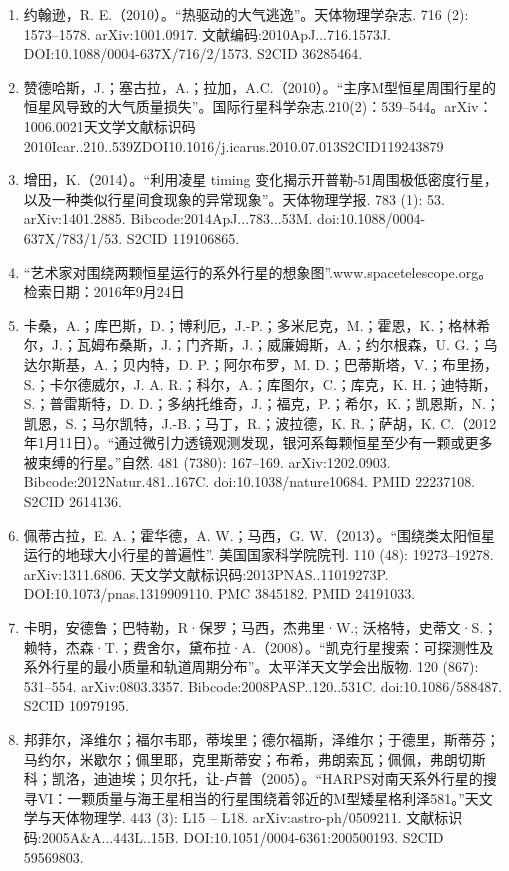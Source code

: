 \begin{enumerate}
\item 约翰逊，R. E.（2010）。“热驱动的大气逃逸”。天体物理学杂志. 716 (2): 1573–1578. arXiv:1001.0917. 文献编码:2010ApJ...716.1573J. DOI:10.1088/0004-637X/716/2/1573. S2CID 36285464.
\item 赞德哈斯，J.；塞古拉，A.；拉加，A.C.（2010）。“主序M型恒星周围行星的恒星风导致的大气质量损失”。国际行星科学杂志.210(2)：539–544。arXiv：1006.0021天文学文献标识码2010Icar..210..539ZDOI10.1016/j.icarus.2010.07.013S2CID119243879
\item 增田，K.（2014）。“利用凌星 timing 变化揭示开普勒-51周围极低密度行星，以及一种类似行星间食现象的异常现象”。天体物理学报. 783 (1): 53. arXiv:1401.2885. Bibcode:2014ApJ...783...53M. doi:10.1088/0004-637X/783/1/53. S2CID 119106865.
\item “艺术家对围绕两颗恒星运行的系外行星的想象图”.www.spacetelescope.org。检索日期：2016年9月24日
\item 卡桑，A.；库巴斯，D.；博利厄，J.-P.；多米尼克，M.；霍恩，K.；格林希尔，J.；瓦姆布桑斯，J.；门齐斯，J.；威廉姆斯，A.；约尔根森，U. G.；乌达尔斯基，A.；贝内特，D. P.；阿尔布罗，M. D.；巴蒂斯塔，V.；布里扬，S.；卡尔德威尔，J. A. R.；科尔，A.；库图尔，C.；库克，K. H.；迪特斯，S.；普雷斯特，D. D.；多纳托维奇，J.；福克，P.；希尔，K.；凯恩斯，N.；凯恩，S.；马尔凯特，J.-B.；马丁，R.；波拉德，K. R.；萨胡，K. C.（2012年1月11日）。“通过微引力透镜观测发现，银河系每颗恒星至少有一颗或更多被束缚的行星。”自然. 481 (7380): 167–169. arXiv:1202.0903. Bibcode:2012Natur.481..167C. doi:10.1038/nature10684. PMID 22237108. S2CID 2614136.
\item 佩蒂古拉，E. A.；霍华德，A. W.；马西，G. W.（2013）。“围绕类太阳恒星运行的地球大小行星的普遍性”. 美国国家科学院院刊. 110 (48): 19273–19278. arXiv:1311.6806. 天文学文献标识码:2013PNAS..11019273P. DOI:10.1073/pnas.1319909110. PMC 3845182. PMID 24191033.
\item 卡明，安德鲁；巴特勒，R·保罗；马西，杰弗里·W.; 沃格特，史蒂文·S.；赖特，杰森·T.；费舍尔，黛布拉·A.（2008）。“凯克行星搜索：可探测性及系外行星的最小质量和轨道周期分布”。太平洋天文学会出版物. 120 (867): 531–554. arXiv:0803.3357. Bibcode:2008PASP..120..531C. doi:10.1086/588487. S2CID 10979195.
\item 邦菲尔，泽维尔；福尔韦耶，蒂埃里；德尔福斯，泽维尔；于德里，斯蒂芬；马约尔，米歇尔；佩里耶，克里斯蒂安；布希，弗朗索瓦；佩佩，弗朗切斯科；凯洛，迪迪埃；贝尔托，让-卢普（2005）。“HARPS对南天系外行星的搜寻VI：一颗质量与海王星相当的行星围绕着邻近的M型矮星格利泽581。”天文学与天体物理学. 443 (3): L15 – L18. arXiv:astro-ph/0509211. 文献标识码:2005A&A...443L..15B. DOI:10.1051/0004-6361:200500193. S2CID 59569803.

\end{enumerate}
